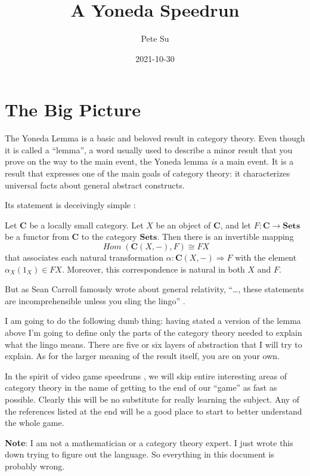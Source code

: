 \documentclass[12pt]{article}
\theoremstyle{definition}
\theoremstyle{definition}
\theoremstyle{definition}
\numberwithin{equation}{section}
\newcommand{\cat}[1]{\mathbf{#1}}      %
\newcommand{\fcat}[1]{{\mathbf {#1}}}    %
\newcommand{\CC}{\cat{C}}
\DeclareMathOperator{\Hom}{\mathit{Hom}}
\newcommand{\Set}{\fcat{Sets}}           %
\newcommand{\iso}{\cong}                %
\newcommand{\fto}{\Rightarrow}
\def\pg{\bigskip\goodbreak\ni}
\def\ni{\goodbreak\noindent}
\begin{document}
\title{A Yoneda Speedrun}
\author{\large Pete Su}
\date{\normalsize 2021-10-30}

\maketitle

\section{The Big Picture}

The Yoneda Lemma is a basic and beloved result in category theory. Even though it is
called a ``lemma'', a word usually used to describe a minor result that you prove on the
way to the main event, the Yoneda lemma {\it is} a main event. It is a result that
expresses one of the main goals of category theory: it characterizes universal facts about
general abstract constructs.

Its statement is deceivingly simple \cite{Riehl2016}:

\pg
Let $\CC$ be a locally small category. Let $X$ be an object of $\CC$, and let $F: \CC \to
\Set$ be a functor from $\CC$ to the category $\Set$. Then there is an invertible mapping
$$
\Hom(\CC(X, -),F) \iso FX
$$
that associates each natural transformation $\alpha:\CC(X,-) \fto F$ with the element
$\alpha_X(1_X) \in FX$. Moreover, this correspondence is natural in both $X$ and $F$.

\pg
But as Sean Carroll famously wrote about general relativity, ``\dots, these statements are
incomprehensible unless you sling the lingo'' \cite{carroll}.

I am going to do the following dumb thing: having stated a version of the lemma above I'm
going to define only the parts of the category theory needed to explain what the lingo
means. There are five or six layers of abstraction that I will 
try to explain. As for the larger meaning of the result itself, you are on your own. 

In the spirit of video game speedruns \cite{lobos}, we will skip entire interesting areas
of category theory in the name of getting to the end of our ``game'' as fast
as possible. Clearly this will be no substitute for really learning the subject. Any of
the references listed at the end will be a good place to start to better understand the
whole game.

\pg
{\bf Note}: I am not a mathematician or a category theory expert. I just wrote this down
trying to figure out the language. So everything in this document is probably wrong.
\end{document}
